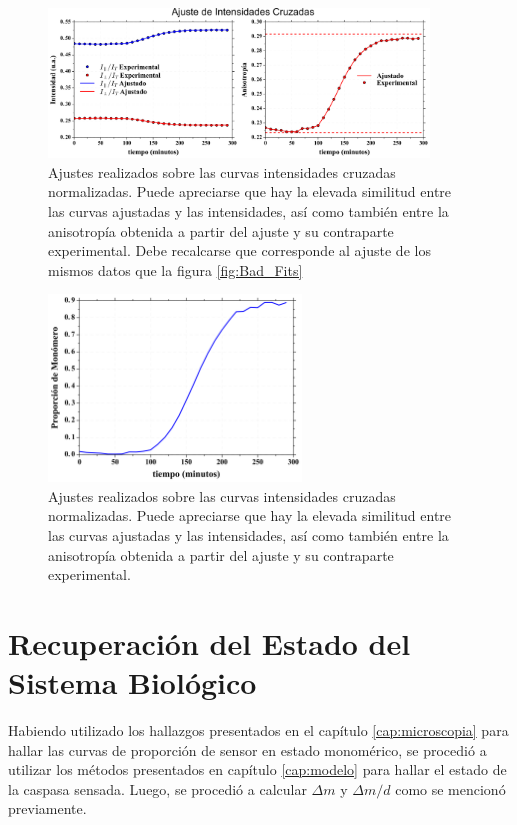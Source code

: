 \begin{figure}
    \centering
    \includegraphics[width=0.9\textwidth]{./img/Cap4/Int_r_Fits.png}
    \caption{Ajustes realizados sobre las curvas intensidades cruzadas normalizadas. Puede apreciarse que hay la elevada similitud entre las curvas ajustadas y las intensidades, así como también entre la anisotropía obtenida a partir del ajuste y su contraparte experimental. Debe recalcarse que corresponde al ajuste de los mismos datos que la figura \ref{fig:Bad_Fits}}
    \label{fig:I_norm_Fit}
\end{figure}

\begin{figure}
    \centering
    \includegraphics[width=0.6\textwidth]{./img/Cap4/Int_r_Fit_mYFP.png}
    \caption{Ajustes realizados sobre las curvas intensidades cruzadas normalizadas. Puede apreciarse que hay la elevada similitud entre las curvas ajustadas y las intensidades, así como también entre la anisotropía obtenida a partir del ajuste y su contraparte experimental.}
    \label{fig:m}
\end{figure}

\section{Recuperación del Estado del Sistema Biológico}

Habiendo utilizado los hallazgos presentados en el capítulo \ref{cap:microscopia} para hallar las curvas de proporción de sensor en estado monomérico, se procedió a utilizar los métodos presentados en capítulo \ref{cap:modelo} para hallar el estado de la caspasa sensada. Luego, se procedió a calcular $\Delta m$ y $\Delta m/d$ como se mencionó previamente.

